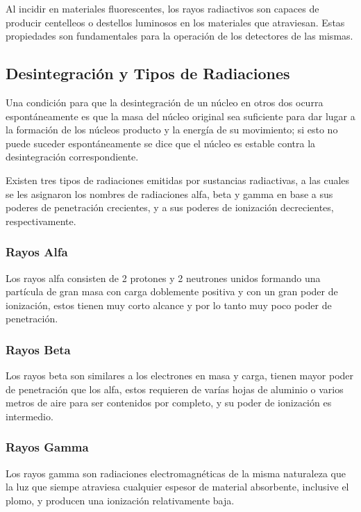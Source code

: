 
Al incidir en materiales fluorescentes, los rayos radiactivos son capaces de producir centelleos o destellos luminosos en los materiales que atraviesan. Estas propiedades son fundamentales para la operación de los detectores de las mismas.

\subsection*{Desintegración y Tipos de Radiaciones}

Una condición para que la desintegración de un núcleo en otros dos ocurra espontáneamente es que la masa del núcleo original sea suficiente para dar lugar a la formación de los núcleos producto y la energía de su movimiento; si esto no puede suceder espontáneamente se dice que el núcleo es estable contra la desintegración correspondiente.

Existen tres tipos de radiaciones emitidas por sustancias radiactivas, a las cuales se les asignaron los nombres de radiaciones alfa, beta y gamma en base a sus poderes de penetración crecientes, y a sus poderes de ionización decrecientes, respectivamente.

\subsubsection*{Rayos Alfa}
Los rayos alfa consisten de 2 protones y 2 neutrones unidos formando una partícula de gran masa con carga doblemente positiva y con un gran poder de ionización, estos tienen muy corto alcance y por lo tanto muy poco poder de penetración.

\subsubsection*{Rayos Beta}
Los rayos beta son similares a los electrones en masa y carga, tienen mayor poder de penetración que los alfa, estos requieren de varías hojas de aluminio o varios metros de aire para ser contenidos por completo, y su poder de ionización es intermedio.

\subsubsection*{Rayos Gamma}
Los rayos gamma son radiaciones electromagnéticas de la misma naturaleza que la luz que siempe atraviesa cualquier espesor de material absorbente, inclusive el plomo, y producen una ionización relativamente baja.

